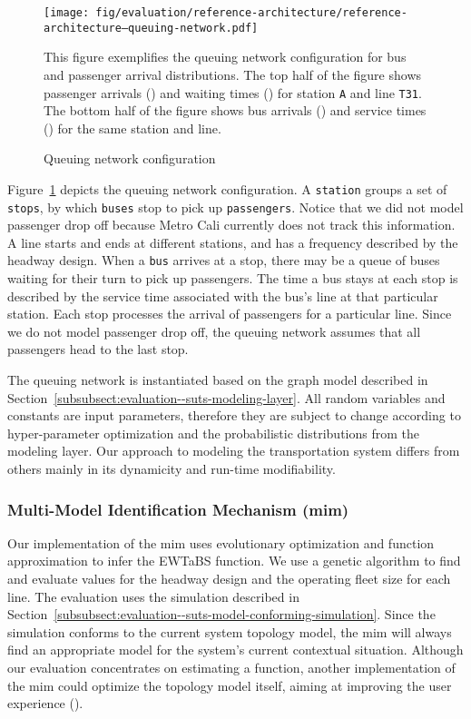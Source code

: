 \begin{figure}[h]
	\centering
	\texttt{[image: fig/evaluation/reference-architecture/reference-architecture--queuing-network.pdf]}
	\caption{Queuing network configuration}
	\label{fig:evaluation--suts-queueing-network}
	This figure exemplifies the queuing network configuration for bus and passenger arrival distributions. The top half of the figure shows passenger arrivals () and waiting times () for station \texttt{A} and line \texttt{T31}. The bottom half of the figure shows bus arrivals () and service times () for the same station and line.
\end{figure}

Figure~\ref{fig:evaluation--suts-queueing-network} depicts the queuing network configuration. A \texttt{station} groups a set of \texttt{stops}, by which \texttt{buses} stop to pick up \texttt{passengers}. Notice that we did not model passenger drop off because Metro Cali currently does not track this information. A line starts and ends at different stations, and has a frequency described by the headway design. When a \texttt{bus} arrives at a stop, there may be a queue of buses waiting for their turn to pick up passengers. The time a bus stays at each stop is described by the service time associated with the bus's line at that particular station. Each stop processes the arrival of passengers for a particular line. Since we do not model passenger drop off, the queuing network assumes that all passengers head to the last stop.

The queuing network is instantiated based on the graph model described in Section~\ref{subsubsect:evaluation--suts-modeling-layer}. All random variables and constants are input parameters, therefore they are subject to change according to hyper-parameter optimization and the probabilistic distributions from the modeling layer. Our approach to modeling the transportation system differs from others mainly in its dynamicity and run-time modifiability.

\subsubsection{Multi-Model Identification Mechanism (\acrshort{mim})}
\label{subsubsect:evaluation--suts-model-identification-mechanism}

Our implementation of the \gls{mim} uses evolutionary optimization and function approximation to infer the \gls{EWTaBS} function. We use a genetic algorithm to find and evaluate values for the headway design and the operating fleet size for each line. The evaluation uses the simulation described in Section~\ref{subsubsect:evaluation--suts-model-conforming-simulation}. Since the simulation conforms to the current system topology model, the \gls{mim} will always find an appropriate model for the system's current contextual situation. Although our evaluation concentrates on estimating a function, another implementation of the \gls{mim} could optimize the topology model itself, aiming at improving the user experience ().

